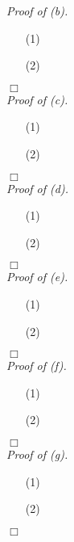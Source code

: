 \documentclass{article}
\begin{document}
\emph{Proof of (b).}
\begin{enumerate}
\item[(1)]
\item[(2)]

\end{enumerate}
$\Box$ \\



\emph{Proof of (c).}
\begin{enumerate}
\item[(1)]
\item[(2)]

\end{enumerate}
$\Box$ \\



\emph{Proof of (d).}
\begin{enumerate}
\item[(1)]
\item[(2)]

\end{enumerate}
$\Box$ \\



\emph{Proof of (e).}
\begin{enumerate}
\item[(1)]
\item[(2)]

\end{enumerate}
$\Box$ \\



\emph{Proof of (f).}
\begin{enumerate}
\item[(1)]
\item[(2)]

\end{enumerate}
$\Box$ \\



\emph{Proof of (g).}
\begin{enumerate}
\item[(1)]
\item[(2)]

\end{enumerate}
$\Box$ \\\\



\end{document}
